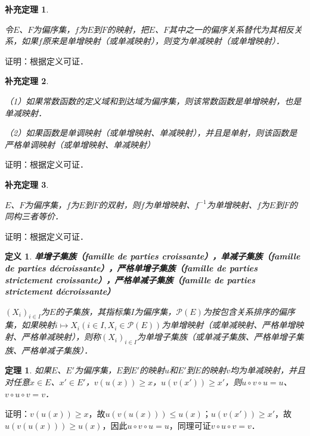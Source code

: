 \documentclass[12pt, a4paper, oneside]{book}
\newtheorem{theo}{定理}
\newtheorem{cor}{补充定理}
\newtheorem{de}{定义}
\begin{document}
			\begin{cor}\label{cor164}
				\hfill\par
				令$E$、$F$为偏序集，$f$为$E$到$F$的映射，把$E$、$F$其中之一的偏序关系替代为其相反关系，如果$f$原来是单增映射（或单减映射），则变为单减映射（或单增映射）．
			\end{cor}
			证明：根据定义可证．
			
			\begin{cor}\label{cor165}
				\hfill\par
				（1）如果常数函数的定义域和到达域为偏序集，则该常数函数是单增映射，也是单减映射．
				\par
				（2）如果函数是单调映射（或单增映射、单减映射），并且是单射，则该函数是严格单调映射（或单增映射、单减映射）
			\end{cor}
			证明：根据定义可证．
			
			\begin{cor}\label{cor166}
				\hfill\par
				$E$、$F$为偏序集，$f$为$E$到$F$的双射，则$f$为单增映射、$f^{-1}$为单增映射、$f$为$E$到$F$的同构三者等价．
			\end{cor}
			证明：根据定义可证．
		
			\begin{de}
				\textbf{单增子集族（famille de parties croissante），单减子集族（famille de parties décroissante），严格单增子集族（famille de parties strictement croissante），严格单减子集族（famille de parties strictement décroissante）}
				\par
				$(X_i)_{i\in I}$为$E$的子集族，其指标集$I$为偏序集，$\mathcal{P}(E)$为按包含关系排序的偏序集，如果映射$i\mapsto X_i(i\in I, X_i\in \mathcal{P}(E))$为单增映射（或单减映射、严格单增映射、严格单减映射），则称$(X_i)_{i\in I}$为单增子集族（或单减子集族、严格单增子集族、严格单减子集族）．
			\end{de}

			\begin{theo}
				\hfill\par
				如果$E$、$E'$为偏序集，$E$到$E'$的映射$u$和$E'$到$E$的映射$v$均为单减映射，并且对任意$x\in E$、$x'\in E'$，$v(u(x))\geq x$，$u(v(x'))\geq x'$，则$u\circ v\circ u=u$、$v\circ u\circ v=v$．
			\end{theo}
			证明：$v(u(x))\geq x$，故$u(v(u(x)))\leq u(x)；u(v(x'))\geq x'$，故$u(v(u(x)))\geq u(x)$，因此$u\circ v\circ u=u$，同理可证$v\circ u\circ v=v$．
			
\end{document}
